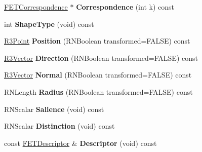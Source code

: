 \begin{DoxyCompactItemize}
\item 
\hyperlink{struct_f_e_t_correspondence}{F\+E\+T\+Correspondence} $\ast$ {\bfseries Correspondence} (int k) const \hypertarget{struct_f_e_t_feature_a739b56be5b202fff47342d8b3cfa6367}{}\label{struct_f_e_t_feature_a739b56be5b202fff47342d8b3cfa6367}

\item 
int {\bfseries Shape\+Type} (void) const \hypertarget{struct_f_e_t_feature_a389c9e9fcb019b31cd82a22eab0f0f4c}{}\label{struct_f_e_t_feature_a389c9e9fcb019b31cd82a22eab0f0f4c}

\item 
\hyperlink{class_r3_point}{R3\+Point} {\bfseries Position} (R\+N\+Boolean transformed=F\+A\+L\+SE) const \hypertarget{struct_f_e_t_feature_af62b20b3c50199d5a74cf30ffa27bab3}{}\label{struct_f_e_t_feature_af62b20b3c50199d5a74cf30ffa27bab3}

\item 
\hyperlink{class_r3_vector}{R3\+Vector} {\bfseries Direction} (R\+N\+Boolean transformed=F\+A\+L\+SE) const \hypertarget{struct_f_e_t_feature_a3a6f52437bca3ee758960ee9480bf340}{}\label{struct_f_e_t_feature_a3a6f52437bca3ee758960ee9480bf340}

\item 
\hyperlink{class_r3_vector}{R3\+Vector} {\bfseries Normal} (R\+N\+Boolean transformed=F\+A\+L\+SE) const \hypertarget{struct_f_e_t_feature_a95231981932e26dd8ad5909aa8a6a792}{}\label{struct_f_e_t_feature_a95231981932e26dd8ad5909aa8a6a792}

\item 
R\+N\+Length {\bfseries Radius} (R\+N\+Boolean transformed=F\+A\+L\+SE) const \hypertarget{struct_f_e_t_feature_a16c0851355f3a5f125f3112ff94280cb}{}\label{struct_f_e_t_feature_a16c0851355f3a5f125f3112ff94280cb}

\item 
R\+N\+Scalar {\bfseries Salience} (void) const \hypertarget{struct_f_e_t_feature_a61df02f1a65f4aadde85a772ef3cd153}{}\label{struct_f_e_t_feature_a61df02f1a65f4aadde85a772ef3cd153}

\item 
R\+N\+Scalar {\bfseries Distinction} (void) const \hypertarget{struct_f_e_t_feature_a3400223732edacf5fa0e6bf1a51f7d5d}{}\label{struct_f_e_t_feature_a3400223732edacf5fa0e6bf1a51f7d5d}

\item 
const \hyperlink{struct_f_e_t_descriptor}{F\+E\+T\+Descriptor} \& {\bfseries Descriptor} (void) const \hypertarget{struct_f_e_t_feature_aa9fb949105cd6455881155ca02557eeb}{}\label{struct_f_e_t_feature_aa9fb949105cd6455881155ca02557eeb}


\end{DoxyCompactItemize}
